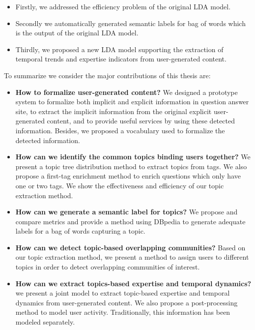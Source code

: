 \begin{itemize}
\item{Firstly, we addressed the efficiency problem of the original LDA model.}
\item{Secondly we automatically generated semantic labels for bag of words which is the output of the original LDA model.}
\item{Thirdly, we proposed a new LDA model supporting the extraction of temporal trends and expertise indicators from user-generated content.}
\end{itemize}

To summarize we consider the major contributions of this thesis are:
\begin{itemize}
\item{\textbf{How to formalize user-generated content?} We designed a prototype system to formalize both implicit and explicit information in question answer site, to extract the implicit information from the original explicit user-generated content, and to provide useful services by using these detected information. Besides, we proposed a vocabulary used to formalize the detected information.}

\item{\textbf{How can we identify the common topics binding users together?} We present a topic tree distribution method to extract topics from tags. We also propose a first-tag enrichment method to enrich questions which only have one or two tags. We show the effectiveness and efficiency of our topic extraction method.}

\item{\textbf{How can we generate a semantic label for topics?} We propose and compare metrics and provide a method using DBpedia to generate adequate labels for a bag of words capturing a topic.}

\item{\textbf{How can we detect topic-based overlapping communities?} Based on our topic extraction method, we present a method to assign users to different topics in order to detect overlapping communities of interest.}

\item{\textbf{How can we extract topics-based expertise and temporal dynamics?} we present a joint model to extract topic-based expertise and temporal dynamics from user-generated content. We also propose a post-processing method to model user activity. Traditionally, this information has been modeled separately.}

\end{itemize}

